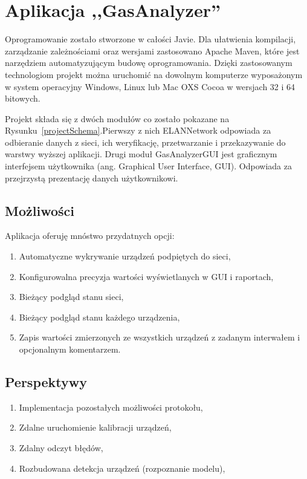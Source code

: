 \section{Aplikacja ,,GasAnalyzer''}
Oprogramowanie zostało stworzone w całości Javie. Dla ułatwienia kompilacji, zarządzanie zależnościami oraz wersjami zastosowano Apache Maven, które jest narzędziem automatyzującym budowę oprogramowania. Dzięki zastosowanym technologiom projekt można uruchomić na dowolnym komputerze wyposażonym w system operacyjny Windows, Linux lub Mac OXS Cocoa w wersjach 32 i 64 bitowych.

Projekt składa się z dwóch modułów co zostało pokazane na Rysunku~\ref{projectSchema}.Pierwszy z nich ELANNetwork odpowiada za odbieranie danych z sieci, ich weryfikację, przetwarzanie i przekazywanie do warstwy wyższej aplikacji.
Drugi moduł GasAnalyzerGUI jest graficznym interfejsem użytkownika (ang. Graphical User Interface, GUI). Odpowiada za przejrzystą prezentację danych użytkownikowi.


\subsection{Możliwości}
Aplikacja oferuję mnóstwo przydatnych opcji:
\begin{enumerate}
\item Automatyczne wykrywanie urządzeń podpiętych do sieci,
\item Konfigurowalna precyzja wartości wyświetlanych w GUI i raportach,
\item Bieżący podgląd stanu sieci,
\item Bieżący podgląd stanu każdego urządzenia,
\item Zapis wartości zmierzonych ze wszystkich urządzeń z zadanym interwałem i opcjonalnym komentarzem.
\end{enumerate}

\subsection{Perspektywy}
\begin{enumerate}
\item Implementacja pozostałych możliwości protokołu,
\item Zdalne uruchomienie kalibracji urządzeń,
\item Zdalny odczyt błędów,
\item Rozbudowana detekcja urządzeń (rozpoznanie modelu),
\end{enumerate}